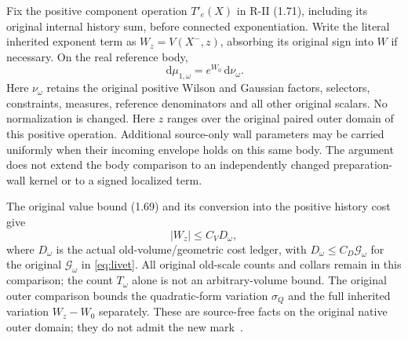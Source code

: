 \documentclass[11pt,letterpaper]{article}
\numberwithin{equation}{section}
\theoremstyle{plain}
\theoremstyle{remark}\newtheorem{remark}[theorem]{Scope}
\newcommand{\dd}{\,\mathrm d}\newcommand{\eps}{\varepsilon}
\begin{document}
Fix the positive component operation $T'_e(X)$ in R-II (1.71), including
its original internal history sum, before connected exponentiation.
Write the literal inherited exponent term as $W_z=V(X^-,z)$,
absorbing its original sign into $W$ if necessary. On the real reference
body,
\begin{equation}
 \dd\mu_{1,\omega}=e^{W_0}\dd\nu_\omega.
 \label{eq:realv}
\end{equation}
Here $\nu_\omega$ retains the original positive Wilson and Gaussian
factors, selectors, constraints, measures, reference denominators and
all other original scalars. No normalization is changed.
Here $z$ ranges over the original paired outer domain of this positive
operation. Additional source-only wall parameters may be carried
uniformly when their incoming envelope holds on this same body.
The argument does not extend the body comparison to an independently
changed preparation-wall kernel or to a signed localized term.

The original value bound (1.69) and its conversion into the positive
history cost give
\begin{equation}
 |W_z|\le C_VD_\omega,
 \label{eq:vvolume}
\end{equation}
where $D_\omega$ is the actual old-volume/geometric cost ledger, with
$D_\omega\le C_D\mathcal G_\omega$ for the original
$\mathcal G_\omega$ in \eqref{eq:livet}. All original old-scale counts
and collars remain in this comparison; the count $T_\omega$ alone is
not an arbitrary-volume bound.
The original outer comparison bounds the quadratic-form variation
$\sigma_Q$ and the full inherited variation $W_z-W_0$ separately.
These are source-free facts on the original native outer domain; they
do not admit the new mark~\cite{rii,W}.
\end{document}
